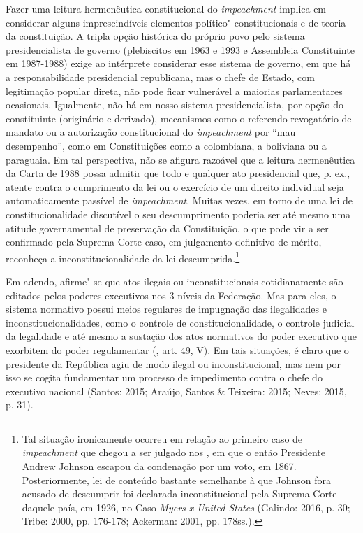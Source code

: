 Fazer uma leitura hermenêutica constitucional do \emph{impeachment}
implica em considerar alguns imprescindíveis elementos
político"-constitucionais e de teoria da constituição. A tripla opção
histórica do próprio povo pelo sistema presidencialista de governo
(plebiscitos em 1963 e 1993 e Assembleia Constituinte em 1987-1988)
exige ao intérprete considerar esse sistema de governo, em que há a
responsabilidade presidencial republicana, mas o chefe de Estado, com
legitimação popular direta, não pode ficar vulnerável a maiorias
parlamentares ocasionais. Igualmente, não há em nosso sistema
presidencialista, por opção do constituinte (originário e derivado),
mecanismos como o referendo revogatório de mandato ou a autorização
constitucional do \emph{impeachment} por ``mau desempenho'', como em
Constituições como a colombiana, a boliviana ou a paraguaia. Em tal
perspectiva, não se afigura razoável que a leitura hermenêutica da Carta
de 1988 possa admitir que todo e qualquer ato presidencial que, p. ex.,
atente contra o cumprimento da lei ou o exercício de um direito
individual seja automaticamente passível de \emph{impeachment}. Muitas
vezes, em torno de uma lei de constitucionalidade discutível o seu
descumprimento poderia ser até mesmo uma atitude governamental de
preservação da Constituição, o que pode vir a ser confirmado pela
Suprema Corte caso, em julgamento definitivo de mérito, reconheça a
inconstitucionalidade da lei descumprida.\footnote{Tal situação
  ironicamente ocorreu em relação ao primeiro caso de \emph{impeachment}
  que chegou a ser julgado nos , em que o então Presidente Andrew
  Johnson escapou da condenação por um voto, em 1867. Posteriormente,
  lei de conteúdo bastante semelhante à que Johnson fora acusado de
  descumprir foi declarada inconstitucional pela Suprema Corte daquele
  país, em 1926, no Caso \emph{Myers x United States} (Galindo: 2016, p.
  30; Tribe: 2000, pp. 176-178; Ackerman: 2001, pp. 178ss.).}

Em adendo, afirme"-se que atos ilegais ou inconstitucionais
cotidianamente são editados pelos poderes executivos nos 3 níveis da
Federação. Mas para eles, o sistema normativo possui meios regulares de
impugnação das ilegalidades e inconstitucionalidades, como o controle de
constitucionalidade, o controle judicial da legalidade e até mesmo a
sustação dos atos normativos do poder executivo que exorbitem do poder
regulamentar (, art. 49, V). Em tais situações, é claro que o
presidente da República agiu de modo ilegal ou inconstitucional, mas nem
por isso se cogita fundamentar um processo de impedimento contra o chefe
do executivo nacional (Santos: 2015; Araújo, Santos \& Teixeira: 2015;
Neves: 2015, p. 31).

